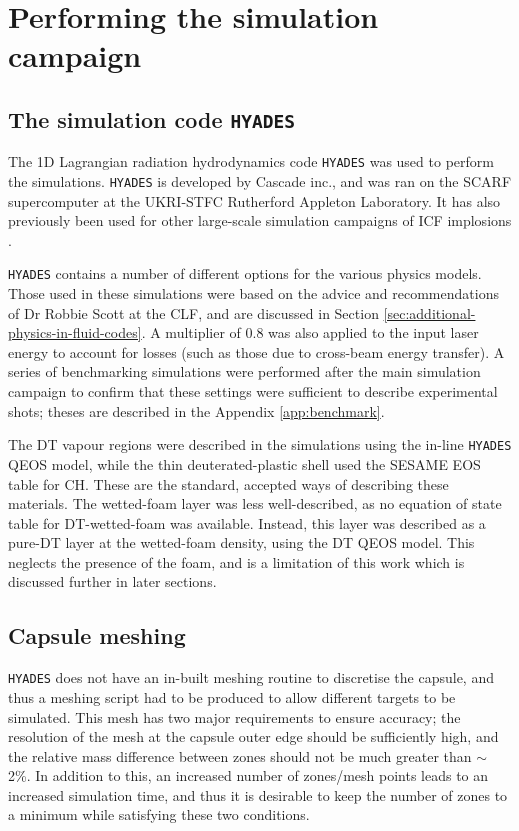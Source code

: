 \section{Performing the simulation campaign} \label{sec: OptimisationCampaign}

\subsection{The simulation code \texttt{HYADES}}

The 1D Lagrangian radiation hydrodynamics code \texttt{HYADES} was used to perform the simulations. \texttt{HYADES} is developed by Cascade inc., and was ran on the SCARF supercomputer at the UKRI-STFC Rutherford Appleton Laboratory. It has also previously been used for other large-scale simulation campaigns of ICF implosions \cite{Hatfield2019}. 

\texttt{HYADES} contains a number of different options for the various physics models. Those used in these simulations were based on the advice and recommendations of Dr Robbie Scott at the CLF, and are discussed in Section \ref{sec:additional-physics-in-fluid-codes}. A multiplier of 0.8 was also applied to the input laser energy to account for losses (such as those due to cross-beam energy transfer). A series of benchmarking simulations were performed after the main simulation campaign to confirm that these settings were sufficient to describe experimental shots; theses are described in the Appendix \ref{app:benchmark}.

The DT vapour regions were described in the simulations using the in-line \texttt{HYADES} QEOS model, while the thin deuterated-plastic shell used the SESAME EOS table for CH. These are the standard, accepted ways of describing these materials. The wetted-foam layer was less well-described, as no equation of state table for DT-wetted-foam was available. Instead, this layer was described as a pure-DT layer at the wetted-foam density, using the  DT QEOS model. This neglects the presence of the foam, and is a limitation of this work which is discussed further in later sections.

\subsection{Capsule meshing}

\texttt{HYADES} does not have an in-built meshing routine to discretise the capsule, and thus a meshing script had to be produced to allow different targets to be simulated. This mesh has two major requirements to ensure accuracy; the resolution of the mesh at the capsule outer edge should be sufficiently high, and the relative mass difference between zones should not be much greater than $\sim$ 2\%. In addition to this, an increased number of zones/mesh points leads to an increased simulation time, and thus it is desirable to keep the number of zones to a minimum while satisfying these two conditions.

